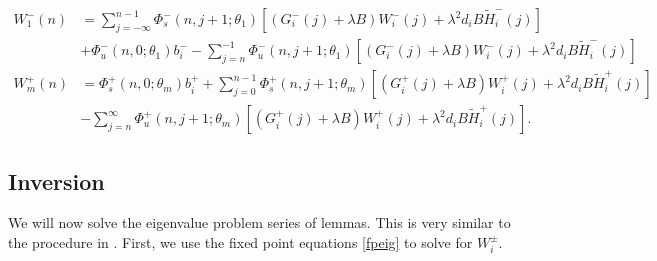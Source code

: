 \documentclass[12pt]{elsarticle}
\begin{document}
\begin{align*}
W_1^-(n) &= \sum_{j = -\infty}^{n-1} \Phi_s^-(n, j+1; \theta_1)
[(G_i^-(j) + \lambda B) W_i^-(j) + \lambda^2 d_i B \tilde{H}_i^-(j)]
 \\
&+ \Phi_u^-(n, 0; \theta_1) b_i^- - \sum_{j = n}^{-1} \Phi_u^-(n, j+1; \theta_1) 
[(G_i^-(j) + \lambda B) W_i^-(j) + \lambda^2 d_i B \tilde{H}_i^-(j)] \\
W_m^+(n) &= \Phi_s^+(n, 0; \theta_m) b_i^+ + \sum_{j = 0}^{n-1} \Phi_s^+(n, j+1; \theta_m) 
[(G_i^+(j) + \lambda B) W_i^+(j) + \lambda^2 d_i B \tilde{H}_i^+(j)] \\
&- \sum_{j = n}^{\infty} \Phi_u^+(n, j+1; \theta_m) 
[(G_i^+(j) + \lambda B) W_i^+(j) + \lambda^2 d_i B \tilde{H}_i^+(j)].
\end{align*}

\subsection{Inversion}

We will now solve the eigenvalue problem series of lemmas. This is very similar to the procedure in \cite{Sandstede1998}. First, we use the fixed point equations \cref{fpeig} to solve for $W_i^\pm$. 
\end{document}
